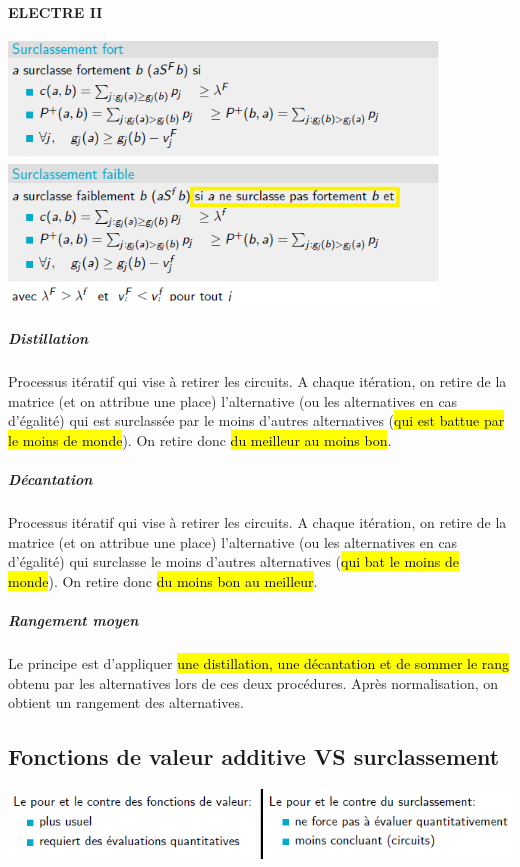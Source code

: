 \documentclass[a4paper, 12pt]{article}
\newcommand{\alinea}{
\hspace*{0.5cm}}
\begin{document}
			\paragraph{ELECTRE II}
				\begin{center}
					\includegraphics[width=4.5in]{Images/electre_2}
				\end{center}
				\subparagraph{Distillation}
					\alinea Processus itératif qui vise à retirer les circuits. A chaque itération, on retire de la matrice 
						(et on attribue une	place) l'alternative (ou les alternatives en cas d'égalité) qui est surclassée
						par le moins d'autres alternatives (\hl{qui est battue par le moins de monde}). On retire
						donc \hl{du meilleur au moins bon}.
				\subparagraph{Décantation}
					\alinea Processus itératif qui vise à retirer les circuits. A chaque itération, on retire de la matrice 
						(et on attribue une	place) l'alternative (ou les alternatives en cas d'égalité) qui surclasse le moins
						d'autres alternatives (\hl{qui bat le moins de monde}). On retire donc \hl{du moins bon au meilleur}.
				\subparagraph{Rangement moyen}
					\alinea Le principe est d'appliquer \hl{une distillation, une décantation et de sommer le rang} obtenu par les 
						alternatives lors de ces deux procédures. Après normalisation, on obtient un rangement des alternatives.
	\subsection{Fonctions de valeur additive VS surclassement}
		\begin{center}
			\includegraphics[width=6in]{Images/fva_vs_surclassement}
		\end{center}
%
\end{document}
